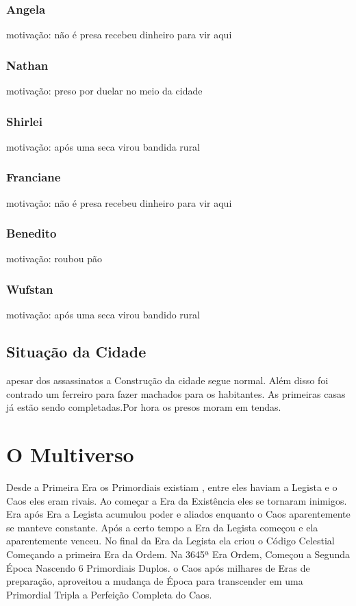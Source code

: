 \subsection{Angela}
motivação: não é presa recebeu dinheiro para vir aqui
\subsection{Nathan}
motivação: preso por duelar no meio da cidade
\subsection{Shirlei}
motivação: após uma seca virou bandida rural 
\subsection{Franciane}
motivação: não é presa recebeu dinheiro para vir aqui
\subsection{Benedito}
motivação: roubou pão
\subsection{Wufstan}
motivação: após uma seca virou bandido rural 
\section{Situação da Cidade}
apesar dos assassinatos a Construção da cidade segue normal.
Além disso foi contrado um ferreiro para fazer machados para os habitantes.
As primeiras casas já estão sendo completadas.Por hora os presos moram em tendas.

\chapter{O Multiverso}
Desde a Primeira Era os Primordiais existiam , entre eles haviam a Legista e o Caos eles eram rivais.
Ao começar a Era da Existência eles se tornaram inimigos.
Era após Era a Legista acumulou poder e aliados enquanto o Caos aparentemente se manteve constante.
Após a certo tempo a Era da Legista começou e ela aparentemente venceu. 
No final da Era da Legista ela criou o Código Celestial Começando a primeira Era da Ordem.
Na 3645ª Era Ordem, Começou a Segunda Época Nascendo 6 Primordiais Duplos. 
o Caos após milhares de Eras de preparação, aproveitou a mudança de Época para
transcender em uma Primordial Tripla a Perfeição Completa do Caos.

